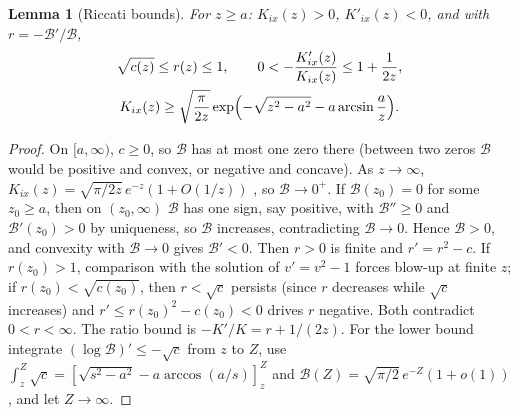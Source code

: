 \documentclass[11pt]{article}
\newtheorem{lemma}[theorem]{Lemma}
\theoremstyle{definition}\newtheorem{definition}[theorem]{Definition}
\theoremstyle{remark}\newtheorem{remark}[theorem]{Remark}
\begin{document}
\begin{lemma}[Riccati bounds]\label{lem:riccati}
For $z\ge a$: $K_{ix}(z)>0$, $K'_{ix}(z)<0$, and with $r=-\mathcal B'/\mathcal B$,
\begin{gather*}
\sqrt{c(z)}\le r(z)\le1,\qquad 0<-\frac{K'_{ix}(z)}{K_{ix}(z)}\le1+\frac1{2z},\\
K_{ix}(z)\ge\sqrt{\frac\pi{2z}}\exp\Bigl(-\sqrt{z^2-a^2}-a\arcsin\frac az\Bigr).
\end{gather*}
\end{lemma}
\begin{proof}
On $[a,\infty)$, $c\ge0$, so $\mathcal B$ has at most one zero there (between two zeros $\mathcal B$ would be positive and convex, or negative and concave). As $z\to\infty$, $K_{ix}(z)=\sqrt{\pi/2z}\,e^{-z}(1+O(1/z))$ \cite[10.40.2]{DLMF}, so $\mathcal B\to0^+$. If $\mathcal B(z_0)=0$ for some $z_0\ge a$, then on $(z_0,\infty)$ $\mathcal B$ has one sign, say positive, with $\mathcal B''\ge0$ and $\mathcal B'(z_0)>0$ by uniqueness, so $\mathcal B$ increases, contradicting $\mathcal B\to0$. Hence $\mathcal B>0$, and convexity with $\mathcal B\to0$ gives $\mathcal B'<0$. Then $r>0$ is finite and $r'=r^2-c$. If $r(z_0)>1$, comparison with the solution of $v'=v^2-1$ forces blow-up at finite $z$; if $r(z_0)<\sqrt{c(z_0)}$, then $r<\sqrt c$ persists (since $r$ decreases while $\sqrt c$ increases) and $r'\le r(z_0)^2-c(z_0)<0$ drives $r$ negative. Both contradict $0<r<\infty$. The ratio bound is $-K'/K=r+1/(2z)$. For the lower bound integrate $(\log\mathcal B)'\le-\sqrt c$ from $z$ to $Z$, use $\int_z^Z\sqrt c=[\sqrt{s^2-a^2}-a\arccos(a/s)]_z^Z$ and $\mathcal B(Z)=\sqrt{\pi/2}\,e^{-Z}(1+o(1))$, and let $Z\to\infty$.
\end{proof}
\end{document}
